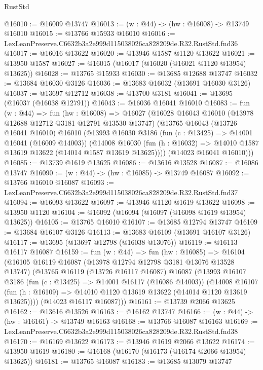 \begin{lexlean}{RustStd}
\begin{coremodule}
@16010 := @16009 @13747
@16013 := (w : @44) -> (hw : @16008) -> @13749 @16010
@16015 := @13766 @15933 @16010
@16016 := LexLeanPreserve.C6632b3a2e999d115038026ca828209de.R32.RustStd.fnd36
@16017 := @16016 @13622
@16020 := @13946 @1587 @1120 @13622
@16021 := @13950 @1587
@16027 := @16015 (@16017 (@16020 (@16021 @1120 @13954) @13625))
@16028 := @13765 @15933
@16030 := @13685 @12688 @13747
@16032 := @13684 @16030 @3126
@16036 := @13683 @16032 (@13691 @16030 @3126)
@16037 := @13697 @12712
@16038 := @13700 @3181
@16041 := @13695 (@16037 (@16038 @12791))
@16043 := @16036 @16041 @16010
@16083 := fun (w : @44) =>
  fun (hw : @16008) =>
  @16027
    (@16028
      @16043
      @16010
      (@13978 @12688 @12712 @3181 @12791 @13530 @13747)
      (@13765
        @16043
        (@13726 @16041 @16010)
        @16010
        (@13993
          @16030
          @3186
          (fun (c : @13425) => @14001 @16041 (@16009 @14003))
          (@14008
            @16030
            (fun (h : @16032) => @14010 @1587 @13619 @13622 (@14014 @1587 @13619 @13625))))
        (@14023 @16041 @16010)))
@16085 := @13739 @1619 @13625
@16086 := @13616 @13528
@16087 := @16086 @13747
@16090 := (w : @44) -> (hw : @16085) -> @13749 @16087
@16092 := @13766 @16010 @16087
@16093 := LexLeanPreserve.C6632b3a2e999d115038026ca828209de.R32.RustStd.fnd37
@16094 := @16093 @13622
@16097 := @13946 @1120 @1619 @13622
@16098 := @13950 @1120
@16104 := @16092 (@16094 (@16097 (@16098 @1619 @13954) @13625))
@16105 := @13765 @16010
@16107 := @13685 @12794 @13747
@16109 := @13684 @16107 @3126
@16113 := @13683 @16109 (@13691 @16107 @3126)
@16117 := @13695 (@13697 @12798 (@16038 @13076))
@16119 := @16113 @16117 @16087
@16159 := fun (w : @44) =>
  fun (hw : @16085) =>
  @16104
    (@16105
      @16119
      @16087
      (@13978 @12794 @12798 @3181 @13076 @13528 @13747)
      (@13765
        @16119
        (@13726 @16117 @16087)
        @16087
        (@13993
          @16107
          @3186
          (fun (c : @13425) => @14001 @16117 (@16086 @14003))
          (@14008
            @16107
            (fun (h : @16109) => @14010 @1120 @13619 @13622 (@14014 @1120 @13619 @13625))))
        (@14023 @16117 @16087)))
@16161 := @13739 @2066 @13625
@16162 := @13616 @13526
@16163 := @16162 @13747
@16166 := (w : @44) -> (hw : @16161) -> @13749 @16163
@16168 := @13766 @16087 @16163
@16169 := LexLeanPreserve.C6632b3a2e999d115038026ca828209de.R32.RustStd.fnd38
@16170 := @16169 @13622
@16173 := @13946 @1619 @2066 @13622
@16174 := @13950 @1619
@16180 := @16168 (@16170 (@16173 (@16174 @2066 @13954) @13625))
@16181 := @13765 @16087
@16183 := @13685 @13079 @13747

\end{coremodule}
\end{lexlean}
